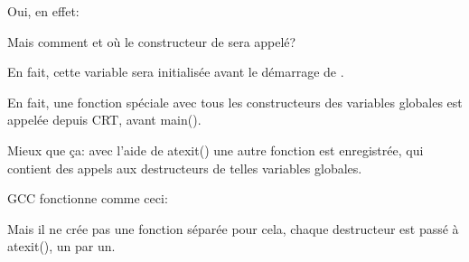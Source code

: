 Oui, en effet:



Mais comment et où le constructeur de  sera appelé?

En fait, cette variable sera initialisée avant le démarrage de \main.








En fait, une fonction spéciale avec tous les constructeurs des variables globales
est appelée depuis \ac{CRT}, avant main().

Mieux que ça: avec l'aide de atexit() une autre fonction est enregistrée, qui contient
des appels aux destructeurs de telles variables globales.

GCC fonctionne comme ceci:



Mais il ne crée pas une fonction séparée pour cela, chaque destructeur est passé
à atexit(), un par un.


